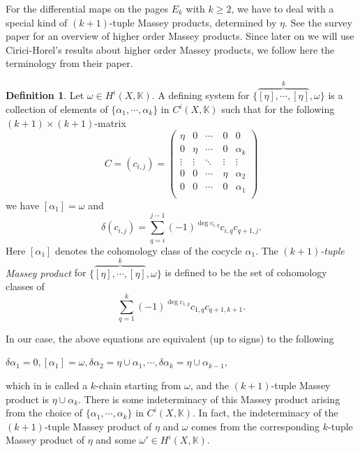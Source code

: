 \documentclass[12pt,leqno,twoside]{amsart}
\theoremstyle{plain}
\theoremstyle{definition}
\newtheorem{defn}[theorem]{Definition}
\newcommand{\K}{\mathbb{K}}
\begin{document}
\smallskip

For the differential maps on the pages $E_k$ with $k\geq 2$, we have to deal with a special kind of $(k+1)$-tuple Massey products, determined by $\eta$. See the survey paper \cite{LM21} for an overview of higher order Massey products.  
Since later on we will use Cirici-Horel's results \cite{CH22} about higher order Massey products, we follow here the terminology from their paper.
\begin{defn}
Let $\omega\in H^i(X,\K)$. 
A defining system for $\{\overbrace{[\eta],\cdots,[\eta]}^{k},\omega \}$ is  a collection of elements of $\{\alpha_1,\cdots,\alpha_k\}$ in $ C^i(X,\K)$ such that for the following $(k+1)\times(k+1)$-matrix
\[
  C=(c_{i,j})= \begin{pmatrix}
    \eta & 0 & \cdots & 0 & 0\\
   0 &  \eta & \cdots & 0 & \alpha_{k}\\
    \vdots & \vdots & \ddots & \vdots& \vdots\\
    0 & 0 & \cdots \ & \eta & \alpha_2\\
    0 & 0 & \cdots & 0 & \alpha_1\\
  \end{pmatrix}  
\]
we have $[\alpha_1]=\omega$
and
$$ \delta(c_{i,j})=\sum_{q=i}^{j-1} (-1)^{\deg c_{i,q}}c_{i,q}c_{q+1,j}.$$ Here $[\alpha_1]$ denotes the cohomology class of the cocycle $\alpha_1$. 
The {\it $(k+1)$-tuple Massey product} for $\{ \overbrace{[\eta],\cdots,[\eta]}^{k},\omega  \}$ is defined to be the set of cohomology classes of $$\sum_{q=1}^k  (-1)^{\deg c_{1,q}}c_{1,q}c_{q+1,k+1}.$$\end{defn}

In our case, the above equations are equivalent (up to signs) to the following
\begin{center}
    $\delta \alpha_1=0, [\alpha_1]=\omega, \delta  \alpha_2=\eta \cup \alpha_1, \cdots, \delta  \alpha_{k}=\eta \cup \alpha_{k-1},$
\end{center} which  in \cite{KP,Paj17,Paj19} is called a $k$-chain starting from $\omega$, 
and the $(k+1)$-tuple Massey product is  $\eta \cup \alpha_k $. 
There is some indeterminacy of this Massey product arising from the choice of $\{\alpha_1,\cdots,\alpha_k\}$ in $ C^i(X,\K)$.
In fact, the indeterminacy  of the $(k+1)$-tuple Massey product of $\eta$ and $\omega$ comes from the corresponding $k$-tuple Massey product of $\eta$ and some $\omega'\in H^{i}(X,\K)$.
\end{document}
